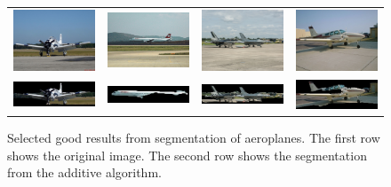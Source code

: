 \documentclass[10pt,twocolumn,letterpaper]{article}
\begin{document}
\begin{figure}[p]
\centering
\begin{tabular}{ p{3cm} p{3cm} p{3cm} p{3cm} }
\includegraphics[width=2.95cm]{figures/add_res/plane/2008_000021.jpg.eps} &
\includegraphics[width=2.95cm]{figures/add_res/plane/2008_001971.jpg.eps} &
\includegraphics[width=2.95cm]{figures/add_res/plane/2008_002673.jpg.eps} &
\includegraphics[width=2.95cm]{figures/add_res/plane/2008_002138.jpg.eps} \\
\includegraphics[width=2.95cm]{figures/add_res/plane/2008_000021.jpg_2_good.jpg.eps} &
\includegraphics[width=2.95cm]{figures/add_res/plane/2008_001971.jpg_2_good.jpg.eps} &
\includegraphics[width=2.95cm]{figures/add_res/plane/2008_002673.jpg_2_good.jpg.eps} &
\includegraphics[width=2.95cm]{figures/add_res/plane/2008_002138.jpg_2_good.jpg.eps} \\
\end{tabular}
\caption{Selected good results from segmentation of aeroplanes.  
The first row shows the original image.  The second row shows
the segmentation from the additive algorithm.}
\label{fig:aeroplane_good_results}
\end{figure}
\end{document}
